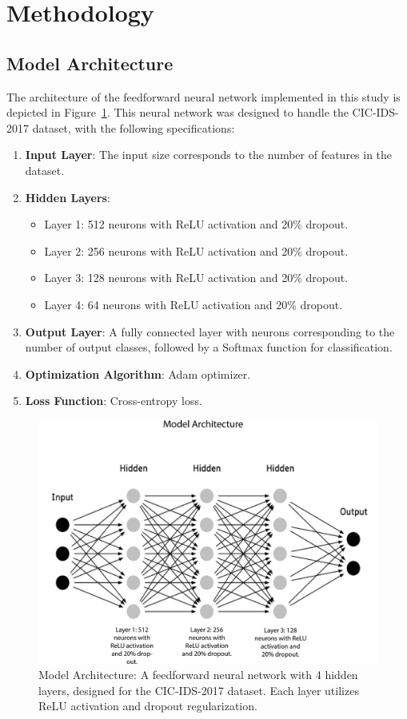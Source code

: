 \documentclass[conference]{IEEEtran}
\begin{document}
\section{Methodology}

\subsection{Model Architecture}
The architecture of the feedforward neural network implemented in this study is depicted in Figure~\ref{fig:model_architecture}. This neural network was designed to handle the CIC-IDS-2017 dataset, with the following specifications:

\begin{enumerate}[label=\roman*)]
    \item \textbf{Input Layer}: The input size corresponds to the number of features in the dataset.
    \item \textbf{Hidden Layers}:
    \begin{itemize}
        \item Layer 1: 512 neurons with ReLU activation and 20\% dropout.
        \item Layer 2: 256 neurons with ReLU activation and 20\% dropout.
        \item Layer 3: 128 neurons with ReLU activation and 20\% dropout.
        \item Layer 4: 64 neurons with ReLU activation and 20\% dropout.
    \end{itemize}
    \item \textbf{Output Layer}: A fully connected layer with neurons corresponding to the number of output classes, followed by a Softmax function for classification.
    \item \textbf{Optimization Algorithm}: Adam optimizer.
    \item \textbf{Loss Function}: Cross-entropy loss.
\end{enumerate}

\begin{figure}[ht]
    \centering
    \includegraphics[width=0.8\linewidth]{1.jpg}
    \caption{Model Architecture: A feedforward neural network with 4 hidden layers, designed for the CIC-IDS-2017 dataset. Each layer utilizes ReLU activation and dropout regularization.}
    \label{fig:model_architecture}
\end{figure}
\end{document}
